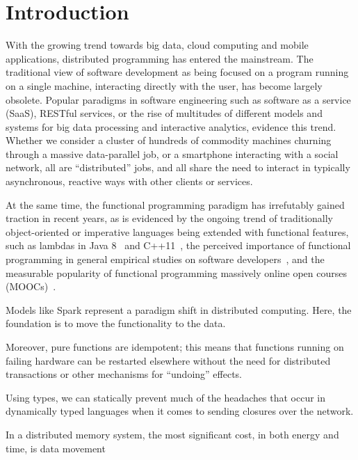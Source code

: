 \documentclass{llncs}
\begin{document}
\section{Introduction}

With the growing trend towards big data, cloud computing and mobile
applications, distributed programming has entered the mainstream. The
traditional view of software development as being focused on a program running
on a single machine, interacting directly with the user, has become largely
obsolete. Popular paradigms in software engineering such as software as a
service (SaaS), RESTful services, or the rise of multitudes of different
models and systems for big data processing and interactive analytics, evidence
this trend. Whether we consider a cluster of hundreds of commodity machines
churning through a massive data-parallel job, or a smartphone interacting with
a social network, all are ``distributed'' jobs, and all share the need to
interact in typically asynchronous, reactive ways with other clients or
services.

At the same time, the functional programming paradigm has irrefutably gained
traction in recent years, as is evidenced by the ongoing trend of
traditionally object-oriented or imperative languages being extended with
functional features, such as lambdas in {Java 8}~\cite{JavaLambdas} and
C++11~\cite{CplusplusLambas}, the perceived importance of functional
programming in general empirical studies on software
developers~\cite{PLAdoption}, and the measurable popularity of functional
programming massively online open courses (MOOCs)~\cite{ICSEMOOC}.

Models like Spark represent a paradigm shift in distributed
computing. Here, the foundation is to move the functionality to the data.

Moreover, pure functions are idempotent; this means that functions running on failing hardware can be restarted elsewhere without the need for distributed transactions or other mechanisms for “undoing” effects.

Using types, we can statically prevent much of the headaches that occur in dynamically typed languages when it comes to sending closures over the network.

\begin{fquote}In a distributed memory system, the most significant cost, in both energy
and time, is data movement
 \end{fquote}
\end{document}
